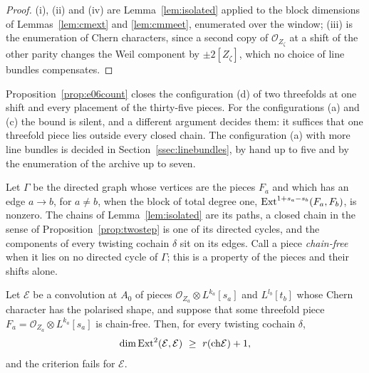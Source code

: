 \begin{proof}
(i), (ii) and (iv) are Lemma~\ref{lem:isolated} applied to the block dimensions of Lemmas~\ref{lem:cmext} and \ref{lem:cmmeet}, enumerated over the window; (iii) is the enumeration of Chern characters, since a second copy of $\mathcal{O}_{Z_{\zeta}}$ at a shift of the other parity changes the Weil component by $\pm2[Z_{\zeta}]$, which no choice of line bundles compensates.
\end{proof}

Proposition~\ref{prop:e06count} closes the configuration (d) of two threefolds at one shift and every placement of the thirty-five pieces. For the configurations (a) and (c) the bound is silent, and a different argument decides them: it suffices that one threefold piece lies outside every closed chain. The configuration (a) with more line bundles is decided in Section~\ref{ssec:linebundles}, by hand up to five and by the enumeration of the archive up to seven.

Let $\Gamma$ be the directed graph whose vertices are the pieces $F_{a}$ and which has an edge $a\to b$, for $a\ne b$, when the block of total degree one, $\mathrm{Ext}^{1+s_{a}-s_{b}}(F_{a},F_{b})$, is nonzero. The chains of Lemma~\ref{lem:isolated} are its paths, a closed chain in the sense of Proposition~\ref{prop:twostep} is one of its directed cycles, and the components of every twisting cochain $\delta$ sit on its edges. Call a piece \emph{chain-free} when it lies on no directed cycle of $\Gamma$; this is a property of the pieces and their shifts alone.

\begin{proposition}\label{prop:chainfree}
Let $\mathcal{E}$ be a convolution at $A_{0}$ of pieces $\mathcal{O}_{Z_{a}}\otimes L^{k_{a}}[s_{a}]$ and $L^{l_{b}}[t_{b}]$ whose Chern character has the polarised shape, and suppose that some threefold piece $F_{a}=\mathcal{O}_{Z_{a}}\otimes L^{k_{a}}[s_{a}]$ is chain-free. Then, for every twisting cochain $\delta$,
\[
\dim\Ext^{2}(\mathcal{E},\mathcal{E})\ \ge\ r(\ch\mathcal{E})+1 ,
\]
and the criterion fails for $\mathcal{E}$.
\end{proposition}

